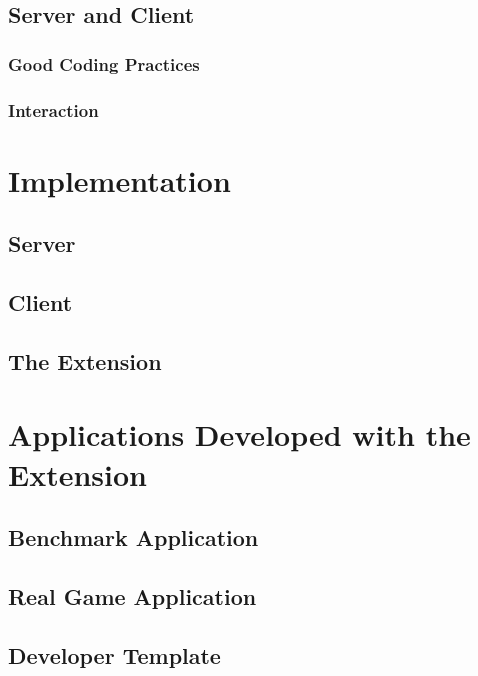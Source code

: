 \documentclass[bsc,frontabs,twoside,singlespacing,parskip,deptreport]{infthesis}     %
\begin{document}
\subsection{Server and Client}
\subsubsection{Good Coding Practices}
\subsubsection{Interaction}

\section{Implementation}
\subsection{Server}
\subsection{Client}
\subsection{The Extension}
\section{Applications Developed with the Extension}
\subsection{Benchmark Application}
\subsection{Real Game Application}
\subsection{Developer Template}
\end{document}
